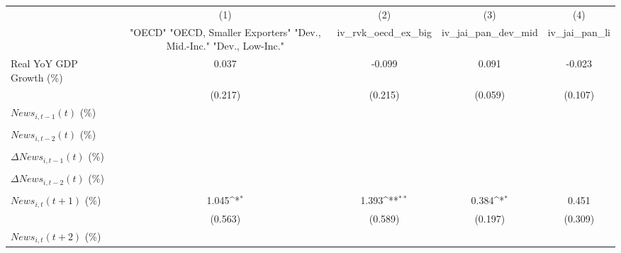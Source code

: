 {
\def\sym#1{\ifmmode^{#1}\else\(^{#1}\)\fi}
\begin{tabular}{l*{4}{c}}
\toprule
                    &\multicolumn{1}{c}{(1)}&\multicolumn{1}{c}{(2)}&\multicolumn{1}{c}{(3)}&\multicolumn{1}{c}{(4)}\\
                    &\multicolumn{1}{c}{ "OECD" "OECD, Smaller Exporters" "Dev., Mid.-Inc." "Dev., Low-Inc."}&\multicolumn{1}{c}{iv_rvk_oecd_ex_big}&\multicolumn{1}{c}{iv_jai_pan_dev_mid}&\multicolumn{1}{c}{iv_jai_pan_li}\\
\midrule
Real YoY GDP Growth (\%)&       0.037         &      -0.099         &       0.091         &      -0.023         \\
                    &     (0.217)         &     (0.215)         &     (0.059)         &     (0.107)         \\
\addlinespace
$ News_{i,t-1}(t)$ (\%)&                     &                     &                     &                     \\
                    &                     &                     &                     &                     \\
\addlinespace
$ News_{i,t-2}(t)$ (\%)&                     &                     &                     &                     \\
                    &                     &                     &                     &                     \\
\addlinespace
$ \Delta News_{i,t-1}(t)$ (\%)&                     &                     &                     &                     \\
                    &                     &                     &                     &                     \\
\addlinespace
$ \Delta News_{i,t-2}(t)$ (\%)&                     &                     &                     &                     \\
                    &                     &                     &                     &                     \\
\addlinespace
$ News_{i,t}(t+1)$ (\%)&       1.045\sym{*}  &       1.393\sym{**} &       0.384\sym{*}  &       0.451         \\
                    &     (0.563)         &     (0.589)         &     (0.197)         &     (0.309)         \\
\addlinespace
$ News_{i,t}(t+2)$ (\%)&                     &                     &                     &                     \\

\end{tabular}}
